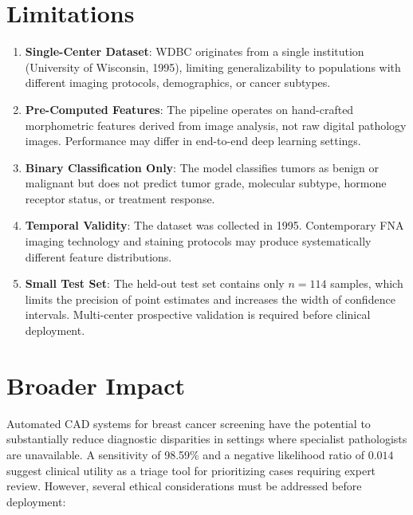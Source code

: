 \documentclass[10pt,letterpaper]{article}
\begin{document}
\section{Limitations}

\begin{enumerate}
    \item \textbf{Single-Center Dataset}: WDBC originates from a single institution (University of
    Wisconsin, 1995), limiting generalizability to populations with different imaging protocols,
    demographics, or cancer subtypes.
    \item \textbf{Pre-Computed Features}: The pipeline operates on hand-crafted morphometric
    features derived from image analysis, not raw digital pathology images. Performance may differ
    in end-to-end deep learning settings.
    \item \textbf{Binary Classification Only}: The model classifies tumors as benign or malignant
    but does not predict tumor grade, molecular subtype, hormone receptor status, or treatment
    response.
    \item \textbf{Temporal Validity}: The dataset was collected in 1995. Contemporary FNA imaging
    technology and staining protocols may produce systematically different feature distributions.
    \item \textbf{Small Test Set}: The held-out test set contains only $n=114$ samples, which
    limits the precision of point estimates and increases the width of confidence intervals.
    Multi-center prospective validation is required before clinical deployment.
\end{enumerate}

\section{Broader Impact}

Automated CAD systems for breast cancer screening have the potential to substantially reduce
diagnostic disparities in settings where specialist pathologists are unavailable. A sensitivity of
98.59\% and a negative likelihood ratio of $0.014$ suggest clinical utility as a triage tool for
prioritizing cases requiring expert review. However, several ethical considerations must be
addressed before deployment:
\end{document}

